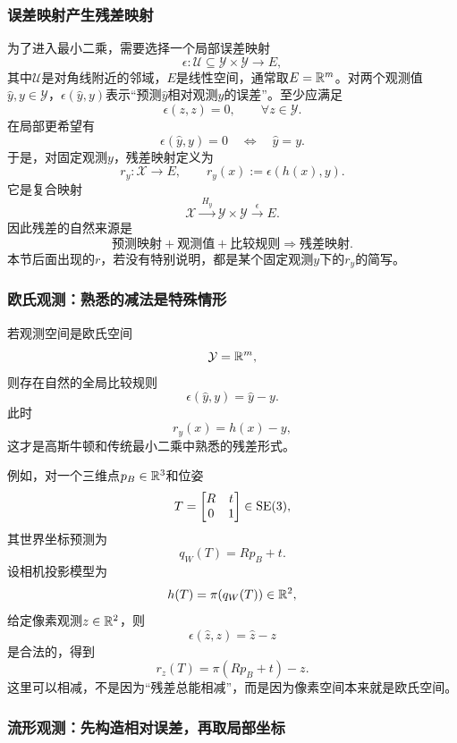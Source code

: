 \subsubsection*{误差映射产生残差映射}

为了进入最小二乘，需要选择一个局部误差映射
\[
    \epsilon:
    \mathcal U\subseteq\mathcal Y\times\mathcal Y
    \to E,
\]
其中$\mathcal U$是对角线附近的邻域，$E$是线性空间，通常取$E=\mathbb{R}^m$。对两个观测值$\hat y,y\in\mathcal Y$，$\epsilon(\hat y,y)$表示“预测$\hat y$相对观测$y$的误差”。至少应满足
\[
    \boxed{\epsilon(z,z)=0,\qquad\forall z\in\mathcal Y.}
\]
在局部更希望有
\[
    \epsilon(\hat y,y)=0
    \quad\Longleftrightarrow\quad
    \hat y=y.
\]
于是，对固定观测$y$，残差映射定义为
\[
    \boxed{
    r_y:\mathcal X\to E,
    \qquad
    r_y(x):=\epsilon(h(x),y).
    }
\]
它是复合映射
\[
    \mathcal X
    \xrightarrow{\ H_y\ }
    \mathcal Y\times\mathcal Y
    \xrightarrow{\ \epsilon\ }
    E.
\]
因此残差的自然来源是
\[
    \boxed{
    \text{预测映射}
    +\text{观测值}
    +\text{比较规则}
    \Longrightarrow
    \text{残差映射}.
    }
\]
本节后面出现的$r$，若没有特别说明，都是某个固定观测$y$下的$r_y$的简写。

\subsubsection*{欧氏观测：熟悉的减法是特殊情形}

若观测空间是欧氏空间
\[
    \mathcal Y=\mathbb{R}^m,
\]
则存在自然的全局比较规则
\[
    \epsilon(\hat y,y)=\hat y-y.
\]
此时
\[
    r_y(x)=h(x)-y,
\]
这才是高斯牛顿和传统最小二乘中熟悉的残差形式。

例如，对一个三维点$p_B\in\mathbb{R}^3$和位姿
\[
    T=
    \begin{bmatrix}R&t\\0&1\end{bmatrix}\in\operatorname{SE}(3),
\]
其世界坐标预测为
\[
    q_W(T)=Rp_B+t.
\]
设相机投影模型为
\[
    h(T)=\pi(q_W(T))\in\mathbb{R}^2,
\]
给定像素观测$z\in\mathbb{R}^2$，则
\[
    \epsilon(\hat z,z)=\hat z-z
\]
是合法的，得到
\[
    \boxed{
    r_z(T)=\pi(Rp_B+t)-z.
    }
\]
这里可以相减，不是因为“残差总能相减”，而是因为像素空间本来就是欧氏空间。

\subsubsection*{流形观测：先构造相对误差，再取局部坐标}


